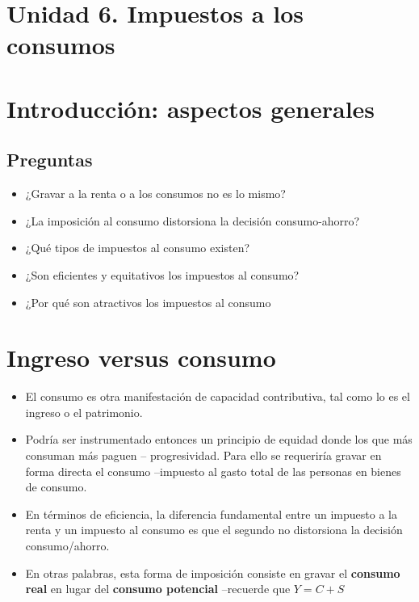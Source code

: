 \documentclass[
  letterpaper,
  DIV=11,
  numbers=noendperiod]{scrartcl}
\providecommand{\tightlist}{%
  \setlength{\itemsep}{0pt}\setlength{\parskip}{0pt}}\usepackage{longtable,booktabs,array}
\begin{document}
\section{\texorpdfstring{\textbf{Unidad 6. Impuestos a los
consumos}}{Unidad 6. Impuestos a los consumos}}\label{unidad-6.-impuestos-a-los-consumos}

\section{\texorpdfstring{\textbf{Introducción: aspectos
generales}}{Introducción: aspectos generales}}\label{introducciuxf3n-aspectos-generales}

\subsection{Preguntas}\label{preguntas}

\begin{itemize}
\item
  ¿Gravar a la renta o a los consumos no es lo mismo?
\item
  ¿La imposición al consumo distorsiona la decisión consumo-ahorro?
\item
  ¿Qué tipos de impuestos al consumo existen?
\item
  ¿Son eficientes y equitativos los impuestos al consumo?
\item
  ¿Por qué son atractivos los impuestos al consumo
\end{itemize}

\section{\texorpdfstring{\textbf{Ingreso versus
consumo}}{Ingreso versus consumo}}\label{ingreso-versus-consumo}

\begin{itemize}
\tightlist
\item
  El consumo es otra manifestación de capacidad contributiva, tal como
  lo es el ingreso o el patrimonio.
\item
  Podría ser instrumentado entonces un principio de equidad donde los
  que más consuman más paguen -- progresividad. Para ello se requeriría
  gravar en forma directa el consumo --impuesto al gasto total de las
  personas en bienes de consumo.
\item
  En términos de eficiencia, la diferencia fundamental entre un impuesto
  a la renta y un impuesto al consumo es que el segundo no distorsiona
  la decisión consumo/ahorro.
\item
  En otras palabras, esta forma de imposición consiste en gravar el
  \textbf{consumo real} en lugar del \textbf{consumo potencial}
  --recuerde que \(Y=C+S\)
\end{itemize}
\end{document}

